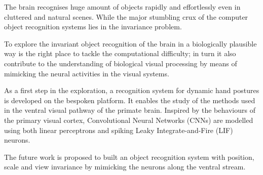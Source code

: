 %

%
%
%
%

%

The brain recognises huge amount of objects rapidly and effortlessly even in cluttered and natural scenes.
While the major stumbling crux of the computer object recognition systems lies in the invariance problem.

To explore the invariant object recognition of the brain in a biologically plausible way is the right place to tackle the computational difficulty;
in turn it also contribute to the understanding of biological visual processing by means of mimicking the neural activities in the visual systems.

As a first step in the exploration, a recognition system for dynamic hand postures is developed on the bespoken platform.
It enables the study of the methods used in the ventral visual pathway of the primate brain.
Inspired by the behaviours of the primary visual cortex, Convolutional Neural Networks (CNNs) are modelled using both linear perceptrons and spiking Leaky Integrate-and-Fire (LIF) neurons.

The future work is proposed to built an object recognition system with position, scale and view invariance by mimicking the neurons along the ventral stream.

